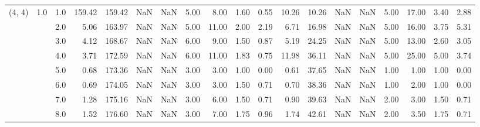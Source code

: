 \begin{tabular}{lllrrrrrrrrrrrrrrrr}
(4, 4) & 1.0 & 1.0  &    159.42 &     159.42 &               NaN &                NaN &  5.00 &   8.00 &             1.60 &                         0.55 &     10.26 &      10.26 &               NaN &                NaN &  5.00 &  17.00 &             3.40 &                         2.88 \\
       &     & 2.0  &      5.06 &     163.97 &               NaN &                NaN &  5.00 &  11.00 &             2.00 &                         2.19 &      6.71 &      16.98 &               NaN &                NaN &  5.00 &  16.00 &             3.75 &                         5.31 \\
       &     & 3.0  &      4.12 &     168.67 &               NaN &                NaN &  6.00 &   9.00 &             1.50 &                         0.87 &      5.19 &      24.25 &               NaN &                NaN &  5.00 &  13.00 &             2.60 &                         3.05 \\
       &     & 4.0  &      3.71 &     172.59 &               NaN &                NaN &  6.00 &  11.00 &             1.83 &                         0.75 &     11.98 &      36.11 &               NaN &                NaN &  5.00 &  25.00 &             5.00 &                         3.74 \\
       &     & 5.0  &      0.68 &     173.36 &               NaN &                NaN &  3.00 &   3.00 &             1.00 &                         0.00 &      0.61 &      37.65 &               NaN &                NaN &  1.00 &   1.00 &             1.00 &                         0.00 \\
       &     & 6.0  &      0.69 &     174.05 &               NaN &                NaN &  3.00 &   3.00 &             1.50 &                         0.71 &      0.70 &      38.36 &               NaN &                NaN &  1.00 &   2.00 &             1.00 &                         0.00 \\
       &     & 7.0  &      1.28 &     175.16 &               NaN &                NaN &  3.00 &   6.00 &             1.50 &                         0.71 &      0.90 &      39.63 &               NaN &                NaN &  2.00 &   3.00 &             1.50 &                         0.71 \\
       &     & 8.0  &      1.52 &     176.60 &               NaN &                NaN &  3.00 &   7.00 &             1.75 &                         0.96 &      1.74 &      42.61 &               NaN &                NaN &  2.00 &   3.50 &             1.75 &                         0.71 \\

\end{tabular}
